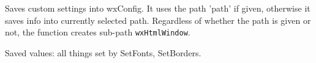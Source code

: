 


\label{wxhtmlwindowwritecustomization}


Saves custom settings into wxConfig. It uses the path 'path'
if given, otherwise it saves info into currently selected path.
Regardless of whether the path is given or not, the function creates sub-path 
{\tt wxHtmlWindow}.

Saved values: all things set by SetFonts, SetBorders.




